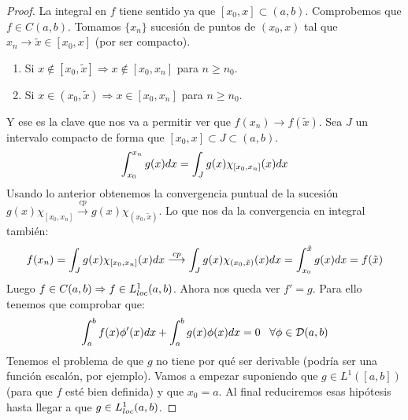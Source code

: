 \begin{proof}

La integral en $f$ tiene sentido ya que $[x_0,x]\subset (a,b)$. Comprobemos que $f\in C(a,b)$. Tomamos $\{x_n\}$ sucesión de puntos de $(x_0,x)$ tal que $x_n\to \tilde{x}\in[x_0,x]$ (por ser compacto).

\begin{center}

\end{center}

\begin{enumerate}[-]
\item Si $x\notin[x_0,\tilde{x}] \Rightarrow x\notin [x_0,x_n]$ para $n\geq n_0$.
\item Si $x\in(x_0,\tilde{x}) \Rightarrow x\in [x_0,x_n]$ para $n\geq n_0$.
\end{enumerate}

Y ese es la clave que nos va a permitir ver que $f(x_n)\to f(\tilde{x})$. Sea $J$ un intervalo compacto de forma que $[x_0,x]\subset J\subset(a,b)$.
\[
\displaystyle\int_{ x_0 }^{ x_n } g(x)dx=\displaystyle\int_{ J }^{  } g(x)\chi_{[x_0,x_n]}(x)dx
\]
Usando lo anterior obtenemos la convergencia puntual de la sucesión $g(x)\chi_{[x_0,x_n]}\overset{cp}{\longrightarrow}g(x)\chi_{(x_0,\tilde{x})}$. Lo que nos da la convergencia en integral también:
\[
f(x_n)=\displaystyle\int_{ J }^{  } g(x)\chi_{[x_0,x_n]}(x)dx\overset{cp}{\longrightarrow}\displaystyle\int_{ J }^{  } g(x)\chi_{(x_0,\tilde{x})}(x)dx=\displaystyle\int_{ x_0 }^{ \tilde{x} } g(x)dx=f(\tilde{x})
\]
Luego $f\in C(a,b) \Rightarrow f\in L^1_{loc}(a,b)$.
Ahora nos queda ver $f'=g$. Para ello tenemos que comprobar que:
\[
\displaystyle\int_{ a }^{ b } f(x)\phi'(x)dx+\displaystyle\int_{ a }^{ b } g(x)\phi(x)dx=0 \;\;\; \forall \phi\in \mathcal{D}(a,b)
\]
Tenemos el problema de que $g$ no tiene por qué ser derivable (podría ser una función escalón, por ejemplo). Vamos a empezar suponiendo que $g\in L^1([a,b])$ (para que $f$ esté bien definida) y que $x_0=a$. Al final reduciremos esas hipótesis hasta llegar a que $g\in L^1_{loc}(a,b)$.


\end{proof}
